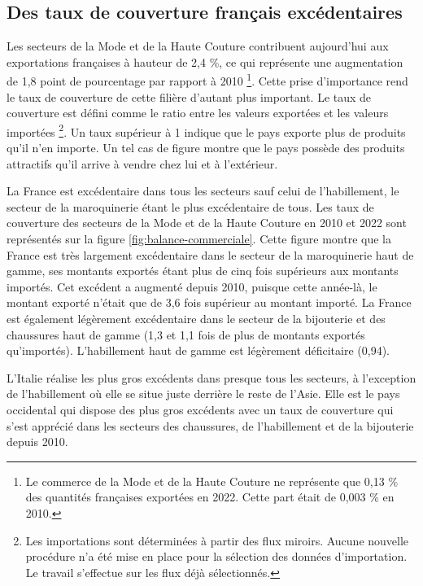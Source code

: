 \documentclass[french,10pt,a4paper]{article}
\begin{document}
\subsection{Des taux de couverture français excédentaires}
Les secteurs de la Mode et de la Haute Couture contribuent aujourd'hui aux exportations françaises à hauteur de 2,4 \%, ce qui représente une augmentation de 1,8 point de pourcentage par rapport à 2010 \footnote{Le commerce de la Mode et de la Haute Couture ne représente que 0,13 \% des quantités françaises exportées en 2022. Cette part était de 0,003 \% en 2010.}. Cette prise d'importance rend le taux de couverture de cette filière d'autant plus important. Le taux de couverture est défini comme le ratio entre les valeurs exportées et les valeurs importées \footnote{Les importations sont déterminées à partir des flux miroirs. Aucune nouvelle procédure n'a été mise en place pour la sélection des données d'importation. Le travail s'effectue sur les flux déjà sélectionnés.}. Un taux supérieur à 1 indique que le pays exporte plus de produits qu'il n'en importe. Un tel cas de figure montre que le pays possède des produits attractifs qu'il arrive à vendre chez lui et à l'extérieur.

\bigskip

La France est excédentaire dans tous les secteurs sauf celui de l'habillement, le secteur de la maroquinerie étant le plus excédentaire de tous. Les taux de couverture des secteurs de la Mode et de la Haute Couture en 2010 et 2022 sont représentés sur la figure \ref{fig:balance-commerciale}. Cette figure montre que la France est très largement excédentaire dans le secteur de la maroquinerie haut de gamme, ses montants exportés étant plus de cinq fois supérieurs aux montants importés. Cet excédent a augmenté depuis 2010, puisque cette année-là, le montant exporté n'était que de 3,6 fois supérieur au montant importé. La France est également légèrement excédentaire dans le secteur de la bijouterie et des chaussures haut de gamme (1,3 et 1,1 fois de plus de montants exportés qu'importés). L'habillement haut de gamme est légèrement déficitaire (0,94).

L'Italie réalise les plus gros excédents dans presque tous les secteurs, à l'exception de l'habillement où elle se situe juste derrière le reste de l'Asie. Elle est le pays occidental qui dispose des plus gros excédents avec un taux de couverture qui s'est apprécié dans les secteurs des chaussures, de l'habillement et de la bijouterie depuis 2010.
\end{document}
